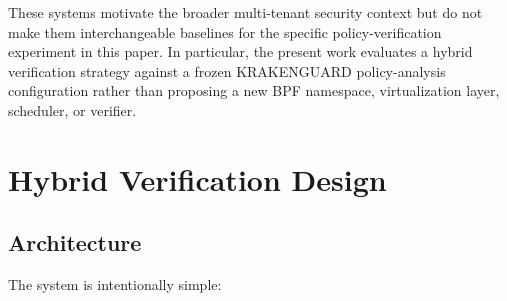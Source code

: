 \documentclass[12pt,a4paper]{article}
\begin{document}
These systems motivate the broader multi-tenant security context but do not make them interchangeable baselines for the specific policy-verification experiment in this paper. In particular, the present work evaluates a hybrid verification strategy against a frozen KRAKENGUARD policy-analysis configuration rather than proposing a new BPF namespace, virtualization layer, scheduler, or verifier.

\section{Hybrid Verification Design}

\subsection{Architecture}

The system is intentionally simple:
\end{document}
